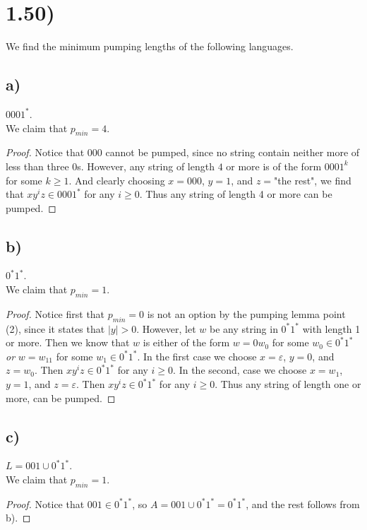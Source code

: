 \documentclass[a4paper,11pt]{article}
\newcommand{\abs}[1]{\left\lvert #1 \right\rvert}
\numberwithin{equation}{section}
\begin{document}
\section*{1.50)}
We find the minimum pumping lengths of the following languages.
\subsection*{a)}
$0001^\ast$.\\
We claim that $p_{min}=4$.
\begin{proof}
Notice that $000$ cannot be pumped, since no string contain neither more of less than three $0$s. However, any string of length $4$ or more is of the form $0001^k$ for some $k\geq1$. And clearly choosing $x=000$, $y=1$, and  $z=$"the rest", we find that $xy^iz\in 0001^\ast$ for any $i\geq0$. Thus any string of length 4 or more can be pumped.
\end{proof}
\subsection*{b)}
$0^\ast1^\ast$.\\
We claim that $p_{min}=1$.
\begin{proof}
Notice first that $p_{min}=0$ is not an option by the pumping lemma point (2), since it states that $\abs{y}>0$. However, let $w$ be any string in $0^\ast1^\ast$ with length 1 or more. Then we know that $w$ is either of the form $w=0w_0$ for some $w_0\in0^\ast1^\ast$ \emph{or} $w=w_11$ for some $w_1\in0^\ast1^\ast$. In the first case we choose $x=\varepsilon$, $y=0$, and $z=w_0$. Then $xy^iz\in0^\ast1^\ast$ for any $i\geq0$. In the second, case we choose $x=w_1$, $y=1$, and $z=\varepsilon$. Then $xy^iz\in0^\ast1^\ast$ for any $i\geq0$. Thus any string of length one or more, can be pumped.
\end{proof}
\subsection*{c)}
$L=001\cup 0^\ast1^\ast$.\\
We claim that $p_{min}=1$.
\begin{proof}
Notice that $001\in0^\ast1^\ast$, so $A=001\cup 0^\ast1^\ast= 0^\ast1^\ast$, and the rest follows from b).
\end{proof}
\end{document}
